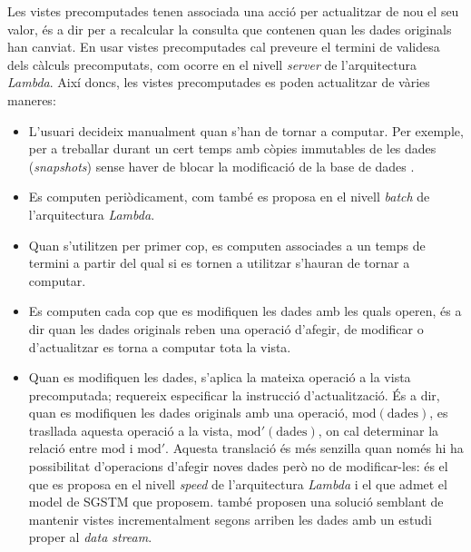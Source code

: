 Les vistes precomputades tenen associada una acció per actualitzar de
nou el seu valor, és a dir per a recalcular la consulta que contenen
quan les dades originals han canviat. En usar vistes precomputades cal
preveure el termini de validesa dels càlculs precomputats, com ocorre
en el nivell \emph{server} de l'arquitectura \emph{Lambda}. Així
doncs, les vistes precomputades es poden actualitzar de vàries
maneres:
\begin{itemize}

\item L'usuari decideix manualment quan s'han de tornar a computar. Per
  exemple, per a treballar durant un cert temps amb còpies immutables
  de les dades (\emph{snapshots}) sense haver de blocar la modificació
  de la base de dades \cite[\S{}10.5]{date04:introduction8}.

\item Es computen periòdicament, com també es proposa en el nivell
  \emph{batch} de l'arquitectura \emph{Lambda}.

\item Quan s'utilitzen per primer cop, es computen associades a un
  temps de termini a partir del qual si es tornen a utilitzar s'hauran
  de tornar a computar. 


\item Es computen cada cop que es modifiquen les dades amb les quals
  operen, és a dir quan les dades originals reben una operació
  d'afegir, de modificar o d'actualitzar es torna a computar tota la
  vista.

\item Quan es modifiquen les dades, s'aplica la mateixa operació a la
  vista precomputada; requereix especificar la instrucció
  d'actualització. És a dir, quan es modifiquen les dades originals
  amb una operació, $\text{mod}(\text{dades})$, es trasllada aquesta
  operació a la vista, $\text{mod}'(\text{dades})$, on cal determinar
  la relació entre $\text{mod}$ i $\text{mod}'$.  Aquesta translació
  és més senzilla quan només hi ha possibilitat d'operacions d'afegir
  noves dades però no de modificar-les: és el que es proposa en el
  nivell \emph{speed} de l'arquitectura \emph{Lambda} i el que admet
  el model de \gls{SGSTM} que proposem. \textcite{jagadish95} també proposen
  una solució semblant de mantenir vistes incrementalment segons
  arriben les dades amb un estudi proper al \emph{data stream}.
\end{itemize}




